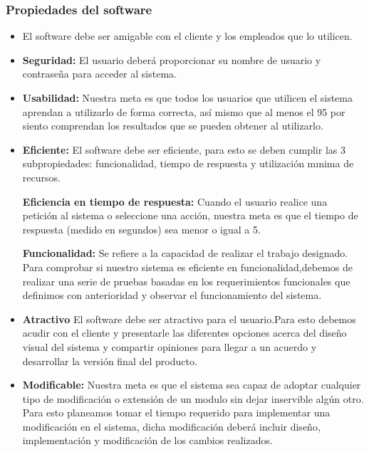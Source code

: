 \subsubsection{Propiedades del software}
\begin{itemize}
    \item El software debe ser amigable con el cliente y los empleados que lo utilicen.
\item\textbf{Seguridad:} El usuario deberá proporcionar su nombre de usuario y contraseña para acceder al sistema.
\item\textbf{Usabilidad:} Nuestra meta es que todos los usuarios que utilicen el sistema aprendan a utilizarlo de forma correcta, así mismo que al menos el 95 por siento comprendan los resultados que se pueden obtener al utilizarlo. 
     \item \textbf{Eficiente:} El software debe ser eficiente, para esto se deben
cumplir las 3 subpropiedades: funcionalidad, tiempo de respuesta y utilización mınima de recursos.

\textbf{Eficiencia en tiempo de respuesta:}
Cuando el usuario realice una petición al sistema o seleccione una acción, nuestra meta es que el tiempo de respuesta (medido en segundos)  sea menor o igual a 5. 

\textbf{Funcionalidad:}
Se refiere a la capacidad de realizar el trabajo designado. 
Para comprobar si nuestro sistema es eficiente en funcionalidad,debemos de realizar una serie de pruebas basadas en los requerimientos funcionales que definimos con anterioridad y observar el funcionamiento del sistema.
 \item
\textbf{Atractivo} El software debe ser atractivo para el usuario.Para esto debemos acudir con el cliente y presentarle las diferentes opciones
acerca del diseño visual del sistema y compartir opiniones para llegar a un acuerdo y  desarrollar la versión final del
producto.
\item\textbf{Modificable:} Nuestra meta es que el sistema sea capaz de adoptar cualquier tipo de modificación o extensión de un modulo sin
dejar inservible algún otro. Para esto planeamos tomar el tiempo requerido para implementar una modificación en el sistema,
dicha modificación deberá incluir diseño, implementación y modificación de los cambios realizados.
\end{itemize}
\clearpage